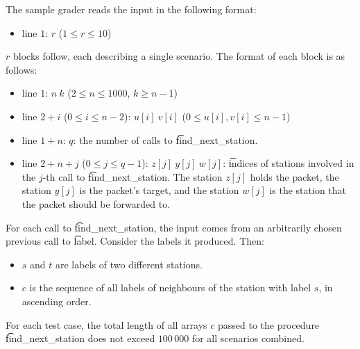 The sample grader reads the input in the following format:
\begin{itemize}
\item line $1$: $r$ ($1 \leq r \leq 10$)
\end{itemize}

$r$ blocks follow, each describing a single scenario. The format of each block is as follows:
\begin{itemize}
\item line $1$: $n\ k$ ($2 \leq n \leq 1000$, $k \geq n-1$)
\item line $2+i$ ($0 \leq i \leq n - 2$): $u[i]\ v[i]$ ($0 \leq u[i], v[i] \leq n - 1$)
\item line $1 + n$: $q$: the number of calls to \t{find\_next\_station}.
\item line $2 + n + j$ ($0 \leq j \leq q - 1$): $z[j]\ y[j]\ w[j]$: \t{indices} of stations involved in the $j$-th call to \t{find\_next\_station}. The station $z[j]$ holds the packet, the station $y[j]$ is the packet's
target, and the station $w[j]$ is the station that the packet should be forwarded to.
\end{itemize}

For each call to \t{find\_next\_station}, the input comes from an arbitrarily chosen previous call to \t{label}. Consider the labels it produced. Then:
\begin{itemize}
\item $s$ and $t$ are labels of two different stations.
\item $c$ is the sequence of all labels of neighbours of the station with label $s$, in ascending order.
\end{itemize}

For each test case, the total length of all arrays $c$ passed to the procedure \t{find\_next\_station} does not exceed $100\,000$ for all scenarios combined.